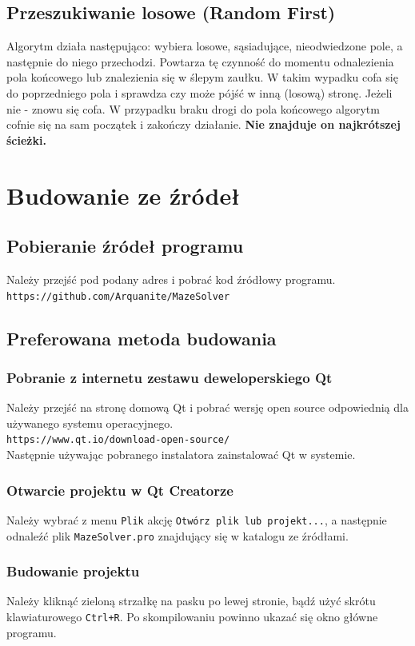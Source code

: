 \documentclass[12pt,a4paper]{article}
\begin{document}
	\subsection{Przeszukiwanie losowe (Random First)}
	Algorytm działa następująco: wybiera losowe, sąsiadujące, nieodwiedzone pole,
	a następnie do niego przechodzi. Powtarza tę czynność do momentu
	odnalezienia pola końcowego lub znalezienia się w ślepym zaułku. W 
	takim wypadku cofa się do poprzedniego pola i sprawdza czy może
	pójść w inną (losową) stronę. Jeżeli nie - znowu się cofa. W 
	przypadku braku drogi do pola końcowego algorytm cofnie się na sam 
	początek i zakończy działanie. \textbf{Nie znajduje on najkrótszej 
	ścieżki.}
	
	\section{Budowanie ze źródeł}

	\subsection{Pobieranie źródeł programu}
	Należy przejść pod podany adres i pobrać kod źródłowy programu.\\
	\texttt{https://github.com/Arquanite/MazeSolver}
	\subsection{Preferowana metoda budowania}

	\subsubsection{Pobranie z internetu zestawu deweloperskiego Qt}
	Należy przejść na stronę domową Qt i pobrać wersję open source odpowiednią
	dla używanego systemu operacyjnego.\\
	\texttt{https://www.qt.io/download-open-source/}\\
	Następnie używając pobranego instalatora zainstalować Qt w systemie.	

	\subsubsection{Otwarcie projektu w Qt Creatorze}
	Należy wybrać z menu \texttt{Plik} akcję \texttt{Otwórz plik lub projekt...},
	a następnie odnaleźć plik \texttt{MazeSolver.pro} znajdujący się w katalogu ze
	źródłami.
	
	\subsubsection{Budowanie projektu}
	Należy kliknąć zieloną strzałkę na pasku po lewej stronie, bądź użyć
	skrótu klawiaturowego \texttt{Ctrl+R}. Po skompilowaniu powinno ukazać
	się okno główne programu.
\end{document}
